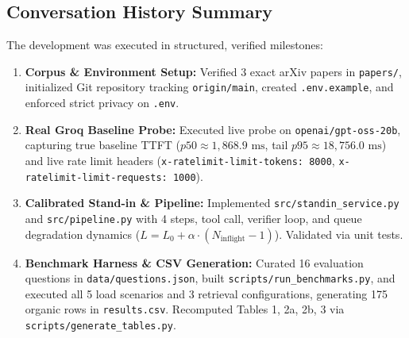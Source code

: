 \documentclass[9pt,a4paper]{article}
\begin{document}
\subsection*{Conversation History Summary}
The development was executed in structured, verified milestones:
\begin{enumerate}
    \item \textbf{Corpus \& Environment Setup:} Verified 3 exact arXiv papers in \texttt{papers/}, initialized Git repository tracking \texttt{origin/main}, created \texttt{.env.example}, and enforced strict privacy on \texttt{.env}.
    \item \textbf{Real Groq Baseline Probe:} Executed live probe on \texttt{openai/gpt-oss-20b}, capturing true baseline TTFT ($p50 \approx 1,868.9\text{ ms}$, tail $p95 \approx 18,756.0\text{ ms}$) and live rate limit headers (\texttt{x-ratelimit-limit-tokens: 8000}, \texttt{x-ratelimit-limit-requests: 1000}).
    \item \textbf{Calibrated Stand-in \& Pipeline:} Implemented \texttt{src/standin_service.py} and \texttt{src/pipeline.py} with 4 steps, tool call, verifier loop, and queue degradation dynamics ($L = L_0 + \alpha \cdot (N_{\text{inflight}}-1)$). Validated via unit tests.
    \item \textbf{Benchmark Harness \& CSV Generation:} Curated 16 evaluation questions in \texttt{data/questions.json}, built \texttt{scripts/run_benchmarks.py}, and executed all 5 load scenarios and 3 retrieval configurations, generating 175 organic rows in \texttt{results.csv}. Recomputed Tables 1, 2a, 2b, 3 via \texttt{scripts/generate_tables.py}.
\end{enumerate}
\end{document}
